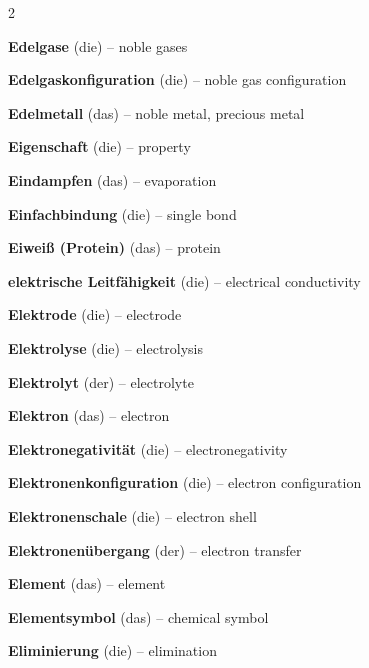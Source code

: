 \begin{multicols}{2}
\par\nopagebreak
\textbf{Edelgase} (die) -- noble gases\dotfill\hyperref[e:91]{\pageref*{e:91}}\par
\textbf{Edelgaskonfiguration} (die) -- noble gas configuration\dotfill\hyperref[e:96]{\pageref*{e:96}}\par
\textbf{Edelmetall} (das) -- noble metal, precious metal\dotfill\hyperref[e:192]{\pageref*{e:192}}\par
\textbf{Eigenschaft} (die) -- property\dotfill\hyperref[e:20]{\pageref*{e:20}}\par
\textbf{Eindampfen} (das) -- evaporation\dotfill\hyperref[e:34]{\pageref*{e:34}}\par
\textbf{Einfachbindung} (die) -- single bond\dotfill\hyperref[e:112]{\pageref*{e:112}}\par
\textbf{Eiweiß (Protein)} (das) -- protein\dotfill\hyperref[e:244]{\pageref*{e:244}}\par
\textbf{elektrische Leitfähigkeit} (die) -- electrical conductivity\dotfill\hyperref[e:27]{\pageref*{e:27}}\par
\textbf{Elektrode} (die) -- electrode\dotfill\hyperref[e:197]{\pageref*{e:197}}\par
\textbf{Elektrolyse} (die) -- electrolysis\dotfill\hyperref[e:195]{\pageref*{e:195}}\par
\textbf{Elektrolyt} (der) -- electrolyte\dotfill\hyperref[e:196]{\pageref*{e:196}}\par
\textbf{Elektron} (das) -- electron\dotfill\hyperref[e:76]{\pageref*{e:76}}\par
\textbf{Elektronegativität} (die) -- electronegativity\dotfill\hyperref[e:98]{\pageref*{e:98}}\par
\textbf{Elektronenkonfiguration} (die) -- electron configuration\dotfill\hyperref[e:79]{\pageref*{e:79}}\par
\textbf{Elektronenschale} (die) -- electron shell\dotfill\hyperref[e:77]{\pageref*{e:77}}\par
\textbf{Elektronenübergang} (der) -- electron transfer\dotfill\hyperref[e:189]{\pageref*{e:189}}\par
\textbf{Element} (das) -- element\dotfill\hyperref[e:3]{\pageref*{e:3}}\par
\textbf{Elementsymbol} (das) -- chemical symbol\dotfill\hyperref[e:84]{\pageref*{e:84}}\par
\textbf{Eliminierung} (die) -- elimination\dotfill\hyperref[e:230]{\pageref*{e:230}}\par

\end{multicols}
